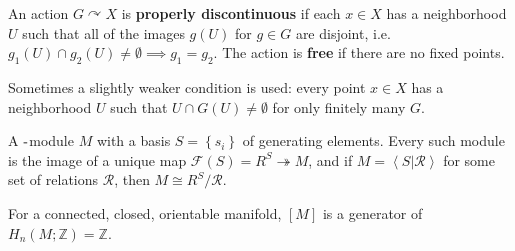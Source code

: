 \begin{definition}

An action \(G\curvearrowright X\) is \textbf{properly discontinuous} if
each \(x\in X\) has a neighborhood \(U\) such that all of the images
\(g(U)\) for \(g\in G\) are disjoint,
i.e.~\(g_1(U) \cap g_2(U) \neq \emptyset \implies g_1 = g_2\). The
action is \textbf{free} if there are no fixed points.

Sometimes a slightly weaker condition is used: every point \(x\in X\)
has a neighborhood \(U\) such that \(U \cap G(U) \neq \emptyset\) for
only finitely many \(G\).

\end{definition}


\begin{definition}

A \({\hbox{-}}\)module \(M\) with a basis \(S = \left\{{s_{i}}\right\}\)
of generating elements. Every such module is the image of a unique map
\(\mathcal{F}(S) = R^S \twoheadrightarrow M\), and if
\(M = \left< S \mathrel{\Big|}\mathcal{R} \right>\) for some set of
relations \(\mathcal{R}\), then \(M \cong R^S / \mathcal{R}\).

\end{definition}

\begin{definition}

\end{definition}


\begin{definition}

\end{definition}


\begin{definition}

For a connected, closed, orientable manifold, \([M]\) is a generator of
\(H_{n}(M; {\mathbb{Z}}) = {\mathbb{Z}}\).

\end{definition}

\begin{definition}

\end{definition}


